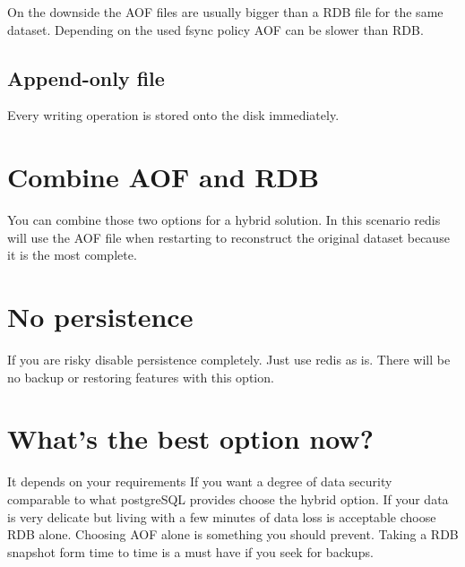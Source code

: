 On the downside the AOF files are usually bigger than a RDB file for the same dataset. Depending on the used fsync policy AOF can be slower than RDB.

\subsection{Append-only file}
Every writing operation is stored onto the disk immediately.

\section{Combine AOF and RDB}
You can combine those two options for a hybrid solution. In this scenario redis will use the AOF file when restarting to reconstruct the original dataset because it is the most complete.

\section{No persistence}
If you are risky disable persistence completely. Just use redis as is. There will be no backup or restoring features with this option.

\section{What's the best option now?}
It depends on your requirements If you want a degree of data security comparable to what postgreSQL provides choose the hybrid option.
If your data is very delicate but living with a few minutes of data loss is acceptable choose RDB alone.
Choosing AOF alone is something you should prevent. Taking a RDB snapshot form time to time is a must have if you seek for backups.